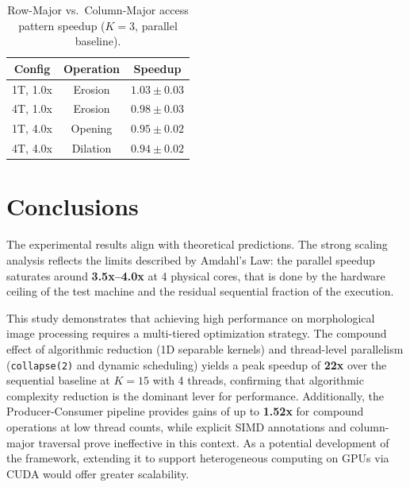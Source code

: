 \documentclass[10pt,twocolumn,letterpaper]{article}
\begin{document}
\begin{table}[H]
\centering
\caption{Row-Major vs.\ Column-Major access pattern speedup 
($K=3$, parallel baseline).}
\label{tab:memory}
\renewcommand{\arraystretch}{1.15}
\begin{tabular}{ccc}
\hline
\textbf{Config} & \textbf{Operation} & \textbf{Speedup} \\
\hline
1T, 1.0x & Erosion  & $1.03 \pm 0.03$ \\
4T, 1.0x & Erosion  & $0.98 \pm 0.03$ \\
1T, 4.0x & Opening  & $0.95 \pm 0.02$ \\
4T, 4.0x & Dilation & $0.94 \pm 0.02$ \\
\hline
\end{tabular}
\end{table}

\section{Conclusions}
\label{sec:conclusions}
The experimental results align with theoretical predictions. 
The strong scaling analysis reflects the limits 
described by Amdahl's Law: the parallel speedup saturates around 
\textbf{3.5x--4.0x} at 4 physical cores, that is done by the hardware ceiling of 
the test machine and the residual sequential fraction 
of the execution.

This study demonstrates that achieving high performance on morphological image 
processing requires a multi-tiered optimization strategy. The compound effect 
of algorithmic reduction (1D separable kernels) and thread-level parallelism 
(\texttt{collapse(2)} and dynamic scheduling) yields a peak speedup of 
\textbf{22x} over the sequential baseline at $K=15$ with 4 threads, confirming 
that algorithmic complexity reduction is the dominant lever for performance. 
Additionally, the Producer-Consumer pipeline provides gains of up to 
\textbf{1.52x} for compound operations at low thread counts, while explicit 
SIMD annotations and column-major traversal prove ineffective in this context. 
As a potential development of the framework, extending it to 
support heterogeneous computing on GPUs via CUDA would offer greater scalability.

{\small


}
\end{document}
